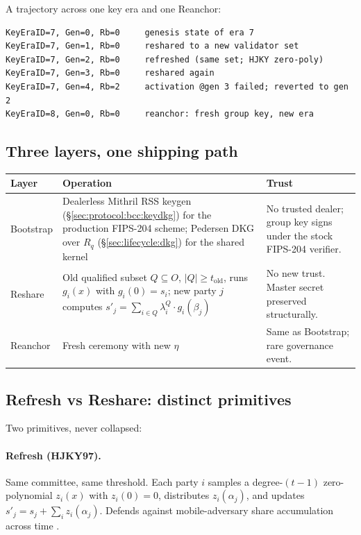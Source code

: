 A trajectory across one key era and one Reanchor:
\begin{verbatim}
KeyEraID=7, Gen=0, Rb=0     genesis state of era 7
KeyEraID=7, Gen=1, Rb=0     reshared to a new validator set
KeyEraID=7, Gen=2, Rb=0     refreshed (same set; HJKY zero-poly)
KeyEraID=7, Gen=3, Rb=0     reshared again
KeyEraID=7, Gen=4, Rb=2     activation @gen 3 failed; reverted to gen 2
KeyEraID=8, Gen=0, Rb=0     reanchor: fresh group key, new era
\end{verbatim}

\subsection{Three layers, one shipping path}

\begin{tabular}{@{}p{}p{}p{}@{}}
  \toprule
  \textbf{Layer} & \textbf{Operation} & \textbf{Trust} \\
  \midrule
  Bootstrap & Dealerless Mithril RSS keygen (\S\ref{sec:protocol:bcc:keydkg}) for the production FIPS-204 scheme; Pedersen DKG over $R_q$ (\S\ref{sec:lifecycle:dkg}) for the shared kernel & No trusted dealer; group key signs under the stock FIPS-204 verifier. \\
  Reshare   & Old qualified subset $Q \subseteq O$, $|Q| \geq t_{\text{old}}$, runs $g_i(x)$ with $g_i(0) = s_i$; new party $j$ computes $s'_j = \sum_{i \in Q} \lambda^Q_i \cdot g_i(\beta_j)$ \cite{desmedtjajodia97} & No new trust. Master secret preserved structurally. \\
  Reanchor  & Fresh ceremony with new $\eta$ & Same as Bootstrap; rare governance event. \\
  \bottomrule
\end{tabular}

\subsection{Refresh vs Reshare: distinct primitives}

Two primitives, never collapsed:

\paragraph{Refresh (HJKY97).}
Same committee, same threshold. Each party $i$ samples a degree-$(t-1)$
zero-polynomial $z_i(x)$ with $z_i(0) = 0$, distributes $z_i(\alpha_j)$,
and updates $s'_j = s_j + \sum_i z_i(\alpha_j)$. Defends against
mobile-adversary share accumulation across time \cite{hjky97}.

